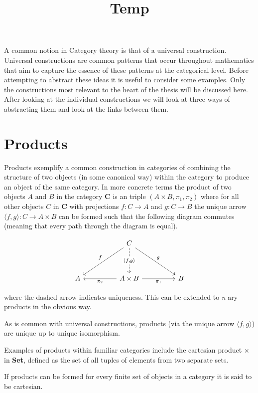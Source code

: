 \documentclass[a4paper,12pt]{article}
\date{}
\title{Temp\vspace{-3.5em}}
\begin{document}
\maketitle
A common notion in Category theory is that of a universal construction.
Universal constructions are common patterns that occur throughout mathematics
that aim to capture the essence of these patterns at the categorical level.
Before attempting to abstract these ideas it is useful to consider some
examples. Only the constructions most relevant to the heart of the thesis will
be discussed here.  After looking at the individual constructions we will look
at three ways of abstracting them and look at the links between them.

\section{Products}
Products exemplify a common construction in categories of combining the
structure of two objects (in some canonical way) within the category to produce
an object of the same category. In more concrete terms the product of two
objects $A$ and $B$ in the category $\textbf{C}$ is an triple $(A \times B,
\pi_{1}, \pi_{2})$ where for all other objects $C$ in $\textbf{C}$ with
projections $f: C \rightarrow A$ and $g: C \rightarrow B$ the unique arrow
$\langle f, g\rangle : C \rightarrow A \times B$ can be formed such that the
following diagram commutes (meaning that every path through the diagram is
equal).

\[\begin{tikzcd}[sep=huge]
 & C \arrow[ld, "f"'] \arrow[rd, "g"] \arrow[d, "{\langle f, g\rangle}" description, dashed] &  \\
A & A \times B \arrow[l, "\pi_2"] \arrow[r, "\pi_1"'] & B
\end{tikzcd}\]

where the dashed arrow indicates uniqueness. This can be extended to
\textit{n}-ary products in the obvious way.

As is common with universal constructions, products (via the unique arrow
$\langle f, g \rangle$) are unique up to unique isomorphism.

Examples of products within familiar categories include the cartesian product
$\times$ in \textbf{Set}, defined as the set of all tuples of elements from two
separate sets.

If products can be formed for every finite set of objects in a category it is
said to be cartesian.
\end{document}

